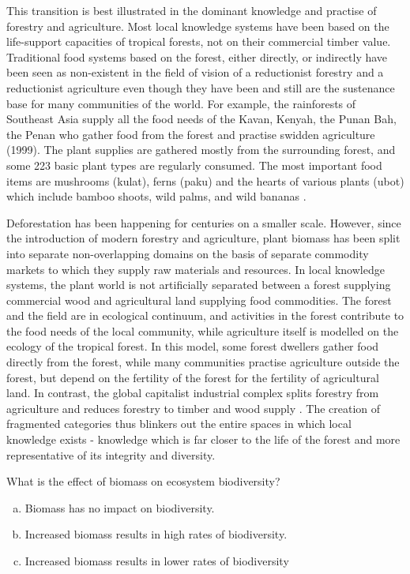 This transition is best illustrated in the dominant knowledge and practise of forestry and agriculture. Most local knowledge systems have been based on the life-support capacities of tropical forests, not on their commercial timber value. Traditional food systems based on the forest, either directly, or indirectly have been seen as non-existent in the field of vision of a reductionist forestry and a reductionist agriculture even though they have been and still are the sustenance base for many communities of the world. For example, the rainforests of Southeast Asia supply all the food needs of the Kavan, Kenyah, the Punan Bah, the Penan who gather food from the forest and practise swidden agriculture (1999). The plant supplies are gathered mostly from the surrounding forest, and some 223 basic plant types are regularly consumed. The most important food items are mushrooms (kulat), ferns (paku) and the hearts of various plants (ubot) which include bamboo shoots, wild palms, and wild bananas \citep{hong1987natives}.

Deforestation has been happening for centuries on a smaller scale. However, since the introduction of modern forestry and agriculture, plant biomass has been split into separate non-overlapping domains on the basis of separate commodity markets to which they supply raw materials and resources. In local knowledge systems, the plant world is not artificially separated between a forest supplying commercial wood and agricultural land supplying food commodities. The forest and the field are in ecological continuum, and activities in the forest contribute to the food needs of the local community, while agriculture itself is modelled on the ecology of the tropical forest. In this model, some forest dwellers gather food directly from the forest, while many communities practise agriculture outside the forest, but depend on the fertility of the forest for the fertility of agricultural land. In contrast, the global capitalist industrial complex splits forestry from agriculture and reduces forestry to timber and wood supply \citep{de1989economic}. The creation of fragmented categories thus blinkers out the entire spaces in which local knowledge exists - knowledge which is far closer to the life of the forest and more representative of its integrity and diversity.





\begin{problem}
What is the effect of biomass on ecosystem biodiversity?
\begin{enumerate}[(a)]
\item Biomass has no impact on biodiversity.
\item Increased biomass results in high rates of biodiversity.
\item Increased biomass results in lower rates of biodiversity 
\end{enumerate}
\end{problem}

